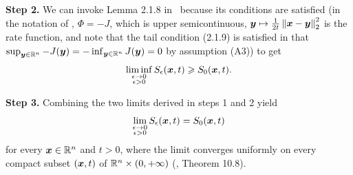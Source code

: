 \textbf{Step 2.} We can invoke Lemma 2.1.8 in~\cite{deuschel2001large} because its conditions are satisfied (in the notation of \cite{deuschel2001large}, $\Phi=-J$, which is upper semicontinuous, $\boldsymbol{y}\mapsto\frac{1}{2t}\left\Vert \boldsymbol{x}-\boldsymbol{y}\right\Vert _{2}^{2}$ is the rate function, and note that the tail condition (2.1.9) is satisfied in that $\sup_{\boldsymbol{y}\in\mathbb{R}^n} -J(\boldsymbol{y}) = -\inf_{\boldsymbol{y}\in\mathbb{R}^n} J(\boldsymbol{y}) = 0$ by assumption (A3)) to get
\[
\liminf_{\substack{\epsilon\to0\\\epsilon>0}}S_{\epsilon}(\boldsymbol{x},t)\geqslant S_0(\boldsymbol{x},t).
\]

\textbf{Step 3.} Combining the two limits derived in steps 1 and 2 yield
\[
\lim_{\substack{\epsilon\to0\\\epsilon>0}}S_{\epsilon}(\boldsymbol{x},t)=S_0(\boldsymbol{x},t)
\]
for every $\boldsymbol{x}\in\mathbb{R}^n$ and $t>0$, where the limit converges uniformly on every compact subset $(\boldsymbol{x},t)$ of $\mathbb{R}^n\times(0,+\infty)$ (\citep{rockafellar1970convex}, Theorem 10.8). 

